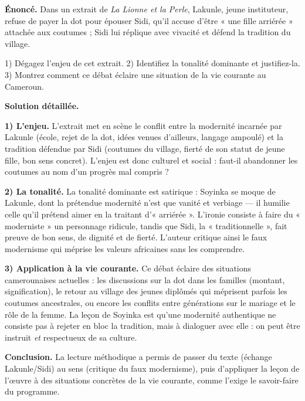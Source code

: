 \documentclass[11pt]{article}
\newcommand{\cle}[1]{{\popxbold\color{popdark}#1}}
\begin{document}
\begin{exoresolu}
\textbf{Énoncé.} Dans un extrait de \emph{La Lionne et la Perle}, Lakunle, jeune instituteur, refuse de payer la dot pour épouser Sidi, qu'il accuse d'être « une fille arriérée » attachée aux coutumes ; Sidi lui réplique avec vivacité et défend la tradition du village.

1) Dégagez l'enjeu de cet extrait. 2) Identifiez la tonalité dominante et justifiez-la. 3) Montrez comment ce débat éclaire une situation de la vie courante au Cameroun.

\tcblower
\textbf{Solution détaillée.}

\textbf{1) L'enjeu.} L'extrait met en scène le conflit entre la \cle{modernité} incarnée par Lakunle (école, rejet de la dot, idées venues d'ailleurs, langage ampoulé) et la \cle{tradition} défendue par Sidi (coutumes du village, fierté de son statut de jeune fille, bon sens concret). L'enjeu est donc culturel et social : faut-il abandonner les coutumes au nom d'un progrès mal compris ?

\textbf{2) La tonalité.} La tonalité dominante est \cle{satirique} : Soyinka se moque de Lakunle, dont la prétendue modernité n'est que vanité et verbiage — il humilie celle qu'il prétend aimer en la traitant d'« arriérée ». L'ironie consiste à faire du « moderniste » un personnage ridicule, tandis que Sidi, la « traditionnelle », fait preuve de bon sens, de dignité et de fierté. L'auteur critique ainsi le faux modernisme qui méprise les valeurs africaines sans les comprendre.

\textbf{3) Application à la vie courante.} Ce débat éclaire des situations camerounaises actuelles : les discussions sur la dot dans les familles (montant, signification), le retour au village des jeunes diplômés qui méprisent parfois les coutumes ancestrales, ou encore les conflits entre générations sur le mariage et le rôle de la femme. La leçon de Soyinka est qu'une modernité authentique ne consiste pas à rejeter en bloc la tradition, mais à dialoguer avec elle : on peut être instruit \emph{et} respectueux de sa culture.

\textbf{Conclusion.} La lecture méthodique a permis de passer du texte (échange Lakunle/Sidi) au sens (critique du faux modernisme), puis d'appliquer la leçon de l'œuvre à des situations concrètes de la vie courante, comme l'exige le savoir-faire du programme.
\end{exoresolu}
\end{document}
